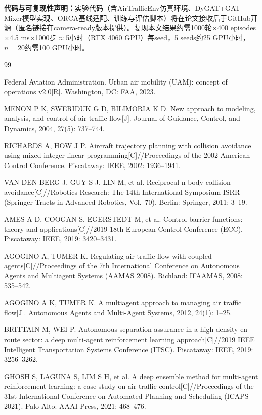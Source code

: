 \documentclass[12pt,a4paper,UTF8]{ctexart}
\begin{document}
\textbf{代码与可复现性声明：}实验代码（含AirTrafficEnv仿真环境、DyGAT+GAT-Mixer模型实现、ORCA基线适配、训练与评估脚本）将在论文接收后于GitHub开源（匿名链接在camera-ready版本提供）。复现本文结果约需1000轮$\times$400 episodes$\times$4.5 ms$\times$1000步$\approx$5小时（RTX 4060 GPU）每seed，5 seeds约25 GPU小时，$n=20$约需100 GPU小时。

\begin{thebibliography}{99}

 Federal Aviation Administration. Urban air mobility (UAM): concept of operations v2.0[R]. Washington, DC: FAA, 2023.

 MENON P K, SWERIDUK G D, BILIMORIA K D. New approach to modeling, analysis, and control of air traffic flow[J]. Journal of Guidance, Control, and Dynamics, 2004, 27(5): 737--744.

 RICHARDS A, HOW J P. Aircraft trajectory planning with collision avoidance using mixed integer linear programming[C]//Proceedings of the 2002 American Control Conference. Piscataway: IEEE, 2002: 1936--1941.

 VAN DEN BERG J, GUY S J, LIN M, et al. Reciprocal n-body collision avoidance[C]//Robotics Research: The 14th International Symposium ISRR (Springer Tracts in Advanced Robotics, Vol.\ 70). Berlin: Springer, 2011: 3--19.

 AMES A D, COOGAN S, EGERSTEDT M, et al. Control barrier functions: theory and applications[C]//2019 18th European Control Conference (ECC). Piscataway: IEEE, 2019: 3420--3431.

 AGOGINO A, TUMER K. Regulating air traffic flow with coupled agents[C]//Proceedings of the 7th International Conference on Autonomous Agents and Multiagent Systems (AAMAS 2008). Richland: IFAAMAS, 2008: 535--542.

 AGOGINO A K, TUMER K. A multiagent approach to managing air traffic flow[J]. Autonomous Agents and Multi-Agent Systems, 2012, 24(1): 1--25.

 BRITTAIN M, WEI P. Autonomous separation assurance in a high-density en route sector: a deep multi-agent reinforcement learning approach[C]//2019 IEEE Intelligent Transportation Systems Conference (ITSC). Piscataway: IEEE, 2019: 3256--3262.

 GHOSH S, LAGUNA S, LIM S H, et al. A deep ensemble method for multi-agent reinforcement learning: a case study on air traffic control[C]//Proceedings of the 31st International Conference on Automated Planning and Scheduling (ICAPS 2021). Palo Alto: AAAI Press, 2021: 468--476.


\end{thebibliography}
\end{document}
